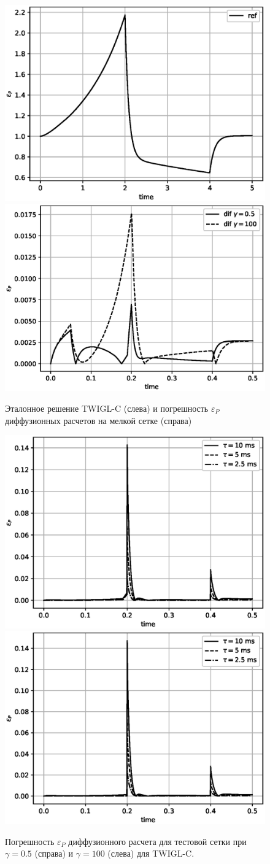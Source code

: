 \documentclass{crm-article}
\begin{document}
\begin{figure}[ht]
\begin{center}
	\includegraphics[width=0.4\linewidth]{sp3_ref_c.eps}\hspace{20pt}
	\includegraphics[width=0.4\linewidth]{odds_c.eps}\\
	\caption{\label{image:canonsummary} Эталонное решение TWIGL-C (слева) и погрешность $\varepsilon_P$ диффузионных расчетов на мелкой сетке (справа)}
	\label{ris:sp3_ref_c}
\end{center}
\end{figure}

\begin{figure}[ht]
\begin{center}
	\includegraphics[width=0.4\linewidth]{dif_tau_c.eps}\hspace{20pt}
	\includegraphics[width=0.4\linewidth]{dif_tau_c_100.eps}\\
	\caption{\label{image:canonsummary} Погрешность $\varepsilon_P$ диффузионного расчета для тестовой сетки при $\gamma=0.5$ (справа) и $\gamma=100$ (слева) для TWIGL-C.}
	\label{ris:dif_tau_c}
\end{center}
\end{figure}
\end{document}

